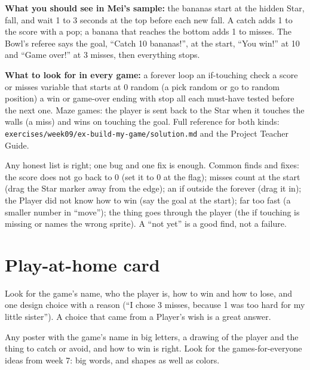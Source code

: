 \begin{answer}
\textbf{What you should see in Mei's sample:} the bananas start at the hidden Star, fall, and wait 1 to 3 seconds at the top before each new fall. A catch adds 1 to the score with a pop; a banana that reaches the bottom adds 1 to misses. The Bowl's referee says the goal, \enquote{Catch 10 bananas!}, at the start, \enquote{You win!} at 10 and \enquote{Game over!} at 3 misses, then everything stops.

\textbf{What to look for in every game:} \tickbox{} a forever loop \quad \tickbox{} an if-touching check \quad \tickbox{} a score or misses variable that starts at 0 \quad \tickbox{} random (a pick random or go to random position) \quad \tickbox{} a win or game-over ending with stop all \quad \tickbox{} each must-have tested before the next one. Maze games: the player is sent back to the Star when it touches the walls (a miss) and wins on touching the goal. Full reference for both kinds: \texttt{exercises/week09/ex-build-my-game/solution.md} and the Project Teacher Guide.
\end{answer}

\begin{answer}
Any honest list is right; one bug and one fix is enough. Common finds and fixes: the score does not go back to 0 (set it to 0 at the flag); misses count at the start (drag the Star marker away from the edge); an if outside the forever (drag it in); the Player did not know how to win (say the goal at the start); far too fast (a smaller number in \enquote{move}); the thing goes through the player (the if touching is missing or names the wrong sprite). A \enquote{not yet} is a good find, not a failure.
\end{answer}

\section{Play-at-home card}
\begin{answer}
Look for the game's name, who the player is, how to win and how to lose, and one design choice with a reason (\enquote{I chose 3 misses, because 1 was too hard for my little sister}). A choice that came from a Player's wish is a great answer.
\end{answer}

\begin{answer}
Any poster with the game's name in big letters, a drawing of the player and the thing to catch or avoid, and how to win is right. Look for the games-for-everyone ideas from week 7: big words, and shapes as well as colors.
\end{answer}
